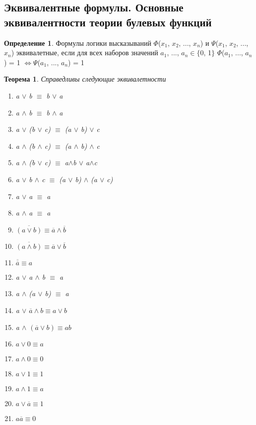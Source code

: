 \documentclass[a4paper]{article}
\newtheorem{theorem}{Теорема}[section]
\theoremstyle{definition}
\newtheorem*{definition}{Определение}
\theoremstyle{remark}
\begin{document}
    \subsection{Эквивалентные формулы. Основные эквивалентности теории булевых функций}
	\begin{definition}
		Формулы логики высказываний 	$\Phi$($x_1$, $x_2$, ..., $x_n$) и $\Psi$($x_1$, $x_2$, ..., $x_n$) эквивалетные, если для всех наборов значений $a_1$, ..., $a_n\in\{$0, 1$\}$
		$\Phi$($a_1$, ..., $a_n$) = 1 $\Leftrightarrow \Psi$($a_1$, ..., $a_n$) = 1
	\end{definition}
	\begin{theorem}
		Справедливы следующие эквивалетности
		\begin{enumerate}
			\item a $\vee$ b $\equiv$ b $\vee$ a
			\item a $\wedge$ b $\equiv$ b $\wedge$ a
			\item a $\vee$ (b $\vee$ c) $\equiv$ (a $\vee$ b) $\vee$ c
			\item a $\wedge$ (b $\wedge$ c) $\equiv$ (a $\wedge$ b) $\wedge$ c
			\item a $\wedge$ (b $\vee$ c) $\equiv$ a$\wedge$b $\vee$ a$\wedge$c
			\item a $\vee$  b $\wedge$ c $\equiv$ (a $\vee$ b) $\wedge$ (a $\vee$ c)
			\item a $\vee$ a $\equiv$ a
			\item a $\wedge$ a $\equiv$ a
			\item $\overline{(a \vee b)} \equiv \overline{a} \wedge \overline{b}$
			\item $\overline{(a \wedge b)} \equiv \overline{a} \vee \overline{b}$
			\item $\overline{\overline{a}} \equiv a$
			\item a $\vee$ a $\wedge$ b $\equiv$ a
			\item a $\wedge$ (a $\vee$ b) $\equiv$ a
			\item a $\vee$ $\overline{a} \wedge b \equiv a \vee b$
			\item a $\wedge$ $(\overline{a} \vee b) \equiv ab$
			\item $a \vee 0 \equiv a$
			\item $a \wedge 0 \equiv 0$
			\item $a \vee 1 \equiv 1$
			\item $a \wedge 1 \equiv a$
			\item $a \vee \overline{a} \equiv 1$
			\item $a\overline{a} \equiv 0$

\end{enumerate}
\end{theorem}
\end{document}
